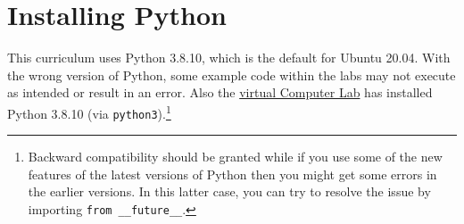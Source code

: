 \label{pythoninstall}

%
%
%
%
%
%
%


\section*{Installing Python}


\begin{warn}
This curriculum uses Python 3.8.10, which is the default for Ubuntu
20.04. With the wrong version of Python, some
example code within the labs may not execute as intended or result in an
error. Also the \href{https://imada.sdu.dk/~jlandersen/imada/it/complab.html#imada-comp-lab}{virtual Computer Lab} has installed Python 3.8.10
(via \lstinline{python3}).\footnote{Backward compatibility should be granted while if you
use some of the new features of the latest versions of Python then you
might get some errors in the earlier versions. In this latter case, you
can try to resolve the issue by importing \lstinline{from __future__}.}
\end{warn}

